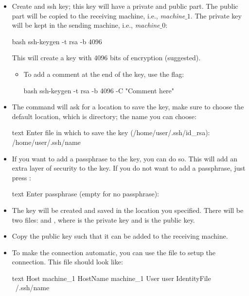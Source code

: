 \begin{itemize}
    \item Create and ssh key; this key will have a private and public part. The public part will be
    copied to the receiving machine, i.e., \textit{machine$\_1$}. The private key will be kept in
    the sending machine, i.e., \textit{machine$\_0$}:
    \begin{mintedbox}{bash}
ssh-keygen -t rsa -b 4096
    \end{mintedbox}
    This will create a key with 4096 bits of encryption (suggested).
    \begin{itemize}
        \item To add a comment at the end of the key, use the  flag:
        \begin{mintedbox}{bash}
ssh-keygen -t rsa -b 4096 -C "Comment here"
        \end{mintedbox}
    \end{itemize}
    \item The command will ask for a location to save the key, make sure to choose the default
    location, which is  directory; the name you can choose:
    \begin{mintedbox}{text}
Enter file in which to save the key (/home/user/.ssh/id_rsa): /home/user/.ssh/name
    \end{mintedbox}
    \item If you want to add a passphrase to the key, you can do so. This will add an extra layer of
    security to the key. If you do not want to add a passphrase, just press :
    \begin{mintedbox}{text}
Enter passphrase (empty for no passphrase):
    \end{mintedbox}
    \item The key will be created and saved in the location you specified. There will be two files:
     and , where  is the private key
    and  is the public key.
    \item Copy the public key such that it can be added to the receiving
    machine.
    \item To make the connection automatic, you can use the file  to
    setup the connection. This file should look like:
    \begin{mintedbox}{text}
Host machine_1
    HostName machine_1
    User user
    IdentityFile ~/.ssh/name
    \end{mintedbox}
\end{itemize}

